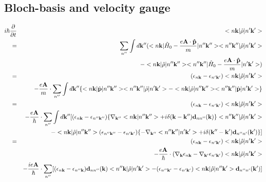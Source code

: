 \documentclass[aps,prb,preprint]{revtex4-1}
\begin{document}
\begin{appendix}
\section{Bloch-basis and velocity gauge}
\begin{eqnarray}
i \hbar \frac{ \partial }{\partial t } &&<n{\bf k}| \hat{\rho} |n'{\bf k'}> \nonumber \\
= &&  \sum_{n''} \int d{\bf k''} ( <n{\bf k}| \hat{H}_0 - \frac{e{\bf A} \cdot {\bf \hat{p}} }{m} |n''{\bf k''}><n''{\bf k''}| \hat{\rho} |n'{\bf k'}>  \nonumber \\
&&-<n{\bf k}| \hat{\rho} |n''{\bf k''}><n''{\bf k''}| \hat{H}_0 - \frac{e{\bf A} \cdot {\bf \hat{p}} }{m}  |n'{\bf k'}> )\nonumber \\
= && (\epsilon_{n{\bf k}}-\epsilon_{n'{\bf k'}}) <n{\bf k}| \hat{\rho} |n'{\bf k'}> \nonumber \\
&& -\frac{e{\bf A}}{m} \cdot \sum_{n''} \int d{\bf k''}\{ <n{\bf k}|\hat{\bf p}|n''{\bf k''}> <n''{\bf k''}| \hat{\rho} |n'{\bf k'}> - <n{\bf k}| \hat{\rho} |n''{\bf k''}><n''{\bf k''}|\hat{\bf p} |n'{\bf k'}> \}  \nonumber \\
= && (\epsilon_{n{\bf k}}-\epsilon_{n'{\bf k'}}) <n{\bf k}| \hat{\rho} |n'{\bf k'}> \nonumber  \\
&& -\frac{e{\bf A}}{\hbar} \cdot \sum_{n''} \int d{\bf k''} [(\epsilon_{n{\bf k}}-\epsilon_{n''{\bf k''}})\{\nabla_{\bf k''} <n{\bf k}|n''{\bf k''}> + i \delta({\bf k-k''}) {\bf d}_{nn''}({\bf k})\} <n''{\bf k''}| \hat{\rho} |n'{\bf k'}>\nonumber  \\
&& - <n{\bf k}| \hat{\rho} |n''{\bf k''}>(\epsilon_{n''{\bf k''}}-\epsilon_{n'{\bf k'}})\{-\nabla_{\bf k''} <n''{\bf k''}|n'{\bf k'}> + i \delta({\bf k''-k'}) {\bf d}_{n''n'}({\bf k'})\} ] \nonumber \\
= && (\epsilon_{n{\bf k}}-\epsilon_{n'{\bf k'}}) <n{\bf k}| \hat{\rho} |n'{\bf k'}> \nonumber  \\
&& -\frac{e{\bf A}}{\hbar} \cdot (\nabla_{\bf k} \epsilon_{n{\bf k}} - \nabla_{\bf k'} \epsilon_{n'{\bf k'}}) <n{\bf k}| \hat{\rho} |n'{\bf k'}> \nonumber  \\
&& -\frac{ie{\bf A}}{\hbar} \cdot  \sum_{n''} [ (\epsilon_{n{\bf k}}-\epsilon_{n''{\bf k}}) {\bf d}_{nn''}({\bf k}) <n''{\bf k}| \hat{\rho} |n'{\bf k'}>  -  (\epsilon_{n''{\bf k'}}-\epsilon_{n'{\bf k'}})<n{\bf k}| \hat{\rho} |n''{\bf k'}> {\bf d}_{n''n'}({\bf k'}) ] \nonumber \\
\end{eqnarray}


\end{appendix}
\end{document}
